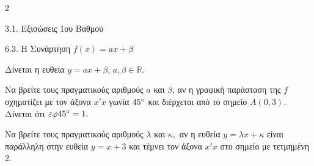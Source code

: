 \begin{ylh}{2}
    \item 3.1. Εξισώσεις 1ου Βαθμού
    \item 6.3. Η Συνάρτηση $f(x)=ax+\beta$
\end{ylh}
Δίνεται η ευθεία $y = a x + \beta$, $a,\beta\mathbb{\in R}$.
\begin{alist}
\item Να βρείτε τους πραγματικούς αριθμούς $a$ και $\beta$, αν η γραφική παράσταση της $f$ σχηματίζει με τον άξονα $x'x$ γωνία $45\degree$ και διέρχεται από το σημείο $A(0, 3)$. Δίνεται ότι $\varepsilon\varphi 45\degree = 1.$
\item Να βρείτε τους πραγματικούς αριθμούς $\lambda$ και $\kappa,$ αν η ευθεία $y = \lambda x + \kappa$ είναι παράλληλη στην ευθεία $y = x + 3$ και τέμνει τον άξονα $x'x$ στο σημείο με τετμημένη $2$.
\end{alist}


